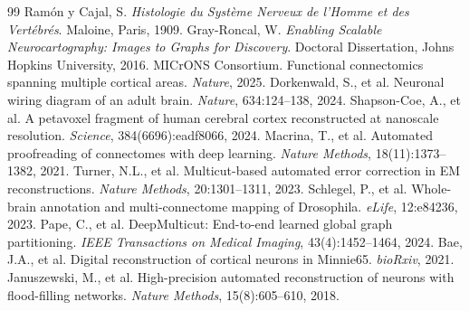 \documentclass[10pt,twocolumn,letterpaper]{article}
\begin{document}
\begin{thebibliography}{99}
 Ram{\'o}n y Cajal, S. \emph{Histologie du Syst{\`e}me Nerveux de l'Homme et des Vert{\'e}br{\'e}s}. Maloine, Paris, 1909.
 Gray-Roncal, W. \emph{Enabling Scalable Neurocartography: Images to Graphs for Discovery}. Doctoral Dissertation, Johns Hopkins University, 2016.
 MICrONS Consortium. Functional connectomics spanning multiple cortical areas. \emph{Nature}, 2025.
 Dorkenwald, S., et al. Neuronal wiring diagram of an adult brain. \emph{Nature}, 634:124--138, 2024.
 Shapson-Coe, A., et al. A petavoxel fragment of human cerebral cortex reconstructed at nanoscale resolution. \emph{Science}, 384(6696):eadf8066, 2024.
 Macrina, T., et al. Automated proofreading of connectomes with deep learning. \emph{Nature Methods}, 18(11):1373--1382, 2021.
 Turner, N.L., et al. Multicut-based automated error correction in EM reconstructions. \emph{Nature Methods}, 20:1301--1311, 2023.
 Schlegel, P., et al. Whole-brain annotation and multi-connectome mapping of Drosophila. \emph{eLife}, 12:e84236, 2023.
 Pape, C., et al. DeepMulticut: End-to-end learned global graph partitioning. \emph{IEEE Transactions on Medical Imaging}, 43(4):1452--1464, 2024.
 Bae, J.A., et al. Digital reconstruction of cortical neurons in Minnie65. \emph{bioRxiv}, 2021.
 Januszewski, M., et al. High-precision automated reconstruction of neurons with flood-filling networks. \emph{Nature Methods}, 15(8):605--610, 2018.
\end{thebibliography}
\end{document}
